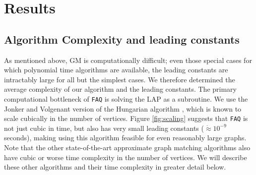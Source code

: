 \documentclass[11pt]{article}
\providecommand{\mc}[1]{\mathcal{#1}}
\newcommand{\FAQ}{\texttt{FAQ} }
\begin{document}
\section{Results} %
\label{sec:results}





\subsection{Algorithm Complexity and leading constants} %
\label{sub:const}

As mentioned above, GM is computationally difficult; even those special cases for which polynomial time algorithms are available, the leading constants are intractably large for all but the simplest cases. We therefore determined the average complexity of our algorithm and the leading constants.  The primary computational bottleneck of \FAQ is solving the LAP as a subroutine.  We use the Jonker and Volgenant version of the Hungarian algorithm \cite{Jonker1987, Burkard2009}, which is known to scale cubically in the number of vertices.  Figure \ref{fig:scaling} suggests that \FAQ is not just cubic in time, but also has very small leading constants ($\dot{\approx} 10^{-9}$ seconds), making using this algorithm feasible for even reasonably large graphs.  Note that the other state-of-the-art approximate graph matching algorithms also have cubic or worse time complexity in the number of vertices.  We will describe these other algorithms and their time complexity in greater detail below.
\end{document}
